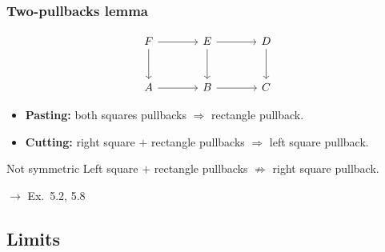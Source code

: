 \documentclass[11pt,t,usepdftitle=false,aspectratio=169]{beamer}
\newcommand{\extag}[1]{\hfill{\scriptsize\color{uibkorange}$\to$ Ex.~#1}}
\begin{document}
\begin{frame}[fragile]
\frametitle{Two-pullbacks lemma}

  \[
  \begin{tikzcd}[sep=large]
    F \ar[r] \ar[d] & E \ar[r] \ar[d] & D \ar[d] \\
    A \ar[r] & B \ar[r] & C
  \end{tikzcd}
  \]

  \begin{itemize}
    \item \textbf{Pasting:} both squares pullbacks $\Rightarrow$ rectangle
      pullback.
    \item \textbf{Cutting:} right square $+$ rectangle pullbacks $\Rightarrow$
      left square pullback.
  \end{itemize}

  \begin{alertblock}{Not symmetric}
    Left square $+$ rectangle pullbacks $\not\Rightarrow$ right square pullback.
  \end{alertblock}

  \extag{5.2, 5.8}

\end{frame}

\subsection{Limits}
\end{document}
